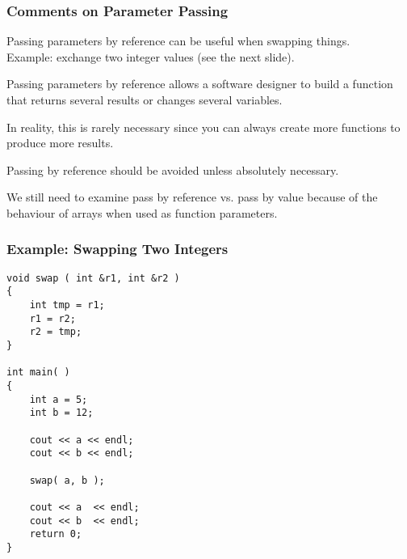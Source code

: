 \begin{frame}
\frametitle{Comments on Parameter Passing}
Passing parameters by reference can be useful when swapping things.\\
\quad Example: exchange two integer values (see the next slide).

Passing parameters by reference allows a software designer to build a function that returns several results or changes several variables.

In reality, this is rarely necessary since you can always create more functions to produce more results.

Passing by reference should be avoided unless absolutely necessary.

We still need to examine pass by reference vs. pass by value because of the behaviour of arrays when used as function parameters.
\end{frame}

\begin{frame}[fragile]
\frametitle{Example: Swapping Two Integers}
{\scriptsize
\begin{verbatim}
void swap ( int &r1, int &r2 )
{
    int tmp = r1;
    r1 = r2;
    r2 = tmp;
}

int main( )
{
    int a = 5;
    int b = 12;
    
    cout << a << endl;
    cout << b << endl;
    
    swap( a, b );
    
    cout << a  << endl;
    cout << b  << endl;
    return 0;
}       
\end{verbatim}
}
\end{frame}



